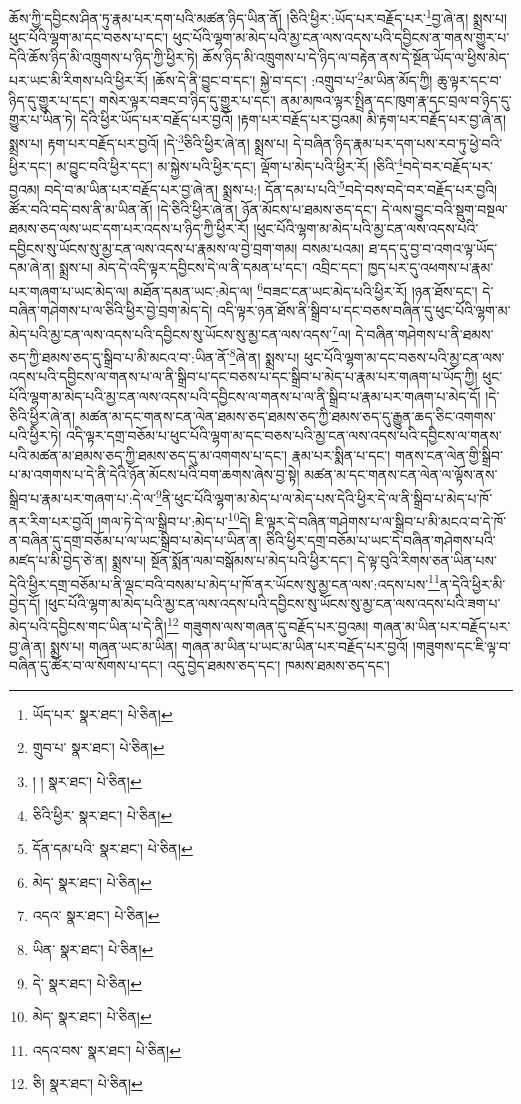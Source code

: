 ཆོས་ཀྱི་དབྱིངས་ཤིན་ཏུ་རྣམ་པར་དག་པའི་མཚན་ཉིད་ཡིན་ནོ། །ཅིའི་ཕྱིར་:ཡོད་པར་བརྗོད་པར་\footnote{ཡོད་པར་  སྣར་ཐང་།  པེ་ཅིན། }བྱ་ཞེ་ན། སྨྲས་པ། ཕུང་པོའི་ལྷག་མ་དང་བཅས་པ་དང་། ཕུང་པོའི་ལྷག་མ་མེད་པའི་མྱ་ངན་ལས་འདས་པའི་དབྱིངས་ན་གནས་གྱུར་པ་དེའི་ཆོས་ཉིད་མི་འཁྲུགས་པ་ཉིད་ཀྱི་ཕྱིར་ཏེ། ཆོས་ཉིད་མི་འཁྲུགས་པ་དེ་ཉིད་ལ་བརྟེན་ནས་དེ་སྔོན་ཡོད་ལ་ཕྱིས་མེད་པར་ཡང་མི་རིགས་པའི་ཕྱིར་རོ། །ཆོས་དེ་ནི་བྱུང་བ་དང་། སྐྱེ་བ་དང་། :འགྲུབ་པ་\footnote{གྲུབ་པ་  སྣར་ཐང་།  པེ་ཅིན། }མ་ཡིན་མོད་ཀྱི། ཆུ་ལྟར་དང་བ་ཉིད་དུ་གྱུར་པ་དང་། གསེར་ལྟར་བཟང་བ་ཉིད་དུ་གྱུར་པ་དང་། ནམ་མཁའ་ལྟར་སྤྲིན་དང་ཁུག་རྣ་དང་བྲལ་བ་ཉིད་དུ་གྱུར་པ་ཡིན་ཏེ། དེའི་ཕྱིར་ཡོད་པར་བརྗོད་པར་བྱའོ། །རྟག་པར་བརྗོད་པར་བྱའམ། མི་རྟག་པར་བརྗོད་པར་བྱ་ཞེ་ན། སྨྲས་པ། རྟག་པར་བརྗོད་པར་བྱའོ། །དེ་\footnote{། །  སྣར་ཐང་།  པེ་ཅིན། }ཅིའི་ཕྱིར་ཞེ་ན། སྨྲས་པ། དེ་བཞིན་ཉིད་རྣམ་པར་དག་པས་རབ་ཏུ་ཕྱེ་བའི་ཕྱིར་དང་། མ་བྱུང་བའི་ཕྱིར་དང་། མ་སྐྱེས་པའི་ཕྱིར་དང་། ལྡོག་པ་མེད་པའི་ཕྱིར་རོ། །ཅིའི་\footnote{ཅིའི་ཕྱིར་  སྣར་ཐང་།  པེ་ཅིན། }བདེ་བར་བརྗོད་པར་བྱའམ། བདེ་བ་མ་ཡིན་པར་བརྗོད་པར་བྱ་ཞེ་ན། སྨྲས་པ:། དོན་དམ་པ་པའི་\footnote{དོན་དམ་པའི་  སྣར་ཐང་།  པེ་ཅིན། }བདེ་བས་བདེ་བར་བརྗོད་པར་བྱའི། ཚོར་བའི་བདེ་བས་ནི་མ་ཡིན་ནོ། །དེ་ཅིའི་ཕྱིར་ཞེ་ན། ཉོན་མོངས་པ་ཐམས་ཅད་དང་། དེ་ལས་བྱུང་བའི་སྡུག་བསྔལ་ཐམས་ཅད་ལས་ཡང་དག་པར་འདས་པ་ཉིད་ཀྱི་ཕྱིར་རོ། །ཕུང་པོའི་ལྷག་མ་མེད་པའི་མྱ་ངན་ལས་འདས་པའི་དབྱིངས་སུ་ཡོངས་སུ་མྱ་ངན་ལས་འདས་པ་རྣམས་ལ་བྱེ་བྲག་གམ། བསམ་པའམ། ཐ་དད་དུ་བྱ་བ་འགའ་ལྟ་ཡོད་དམ་ཞེ་ན། སྨྲས་པ། མེད་དེ་འདི་ལྟར་དབྱིངས་དེ་ལ་ནི་དམན་པ་དང་། འབྲིང་དང་། ཁྱད་པར་དུ་འཕགས་པ་རྣམ་པར་གཞག་པ་ཡང་མེད་ལ། མཐོན་དམན་ཡང་:མེད་ལ། \footnote{མེད་  སྣར་ཐང་།  པེ་ཅིན། }བཟང་ངན་ཡང་མེད་པའི་ཕྱིར་རོ། །ཉན་ཐོས་དང་། དེ་བཞིན་གཤེགས་པ་ལ་ཅིའི་ཕྱིར་བྱེ་བྲག་མེད་དེ། འདི་ལྟར་ཉན་ཐོས་ནི་སྒྲིབ་པ་དང་བཅས་བཞིན་དུ་ཕུང་པོའི་ལྷག་མ་མེད་པའི་མྱ་ངན་ལས་འདས་པའི་དབྱིངས་སུ་ཡོངས་སུ་མྱ་ངན་ལས་འདས་\footnote{འདའ་  སྣར་ཐང་།  པེ་ཅིན། }ལ། དེ་བཞིན་གཤེགས་པ་ནི་ཐམས་ཅད་ཀྱི་ཐམས་ཅད་དུ་སྒྲིབ་པ་མི་མངའ་བ་:ཡིན་ནོ་\footnote{ཡིན་  སྣར་ཐང་།  པེ་ཅིན། }ཞེ་ན། སྨྲས་པ། ཕུང་པོའི་ལྷག་མ་དང་བཅས་པའི་མྱ་ངན་ལས་འདས་པའི་དབྱིངས་ལ་གནས་པ་ལ་ནི་སྒྲིབ་པ་དང་བཅས་པ་དང་སྒྲིབ་པ་མེད་པ་རྣམ་པར་གཞག་པ་ཡོད་ཀྱི། ཕུང་པོའི་ལྷག་མ་མེད་པའི་མྱ་ངན་ལས་འདས་པའི་དབྱིངས་ལ་གནས་པ་ལ་ནི་སྒྲིབ་པ་རྣམ་པར་གཞག་པ་མེད་དོ། །དེ་ཅིའི་ཕྱིར་ཞེ་ན། མཚན་མ་དང་གནས་ངན་ལེན་ཐམས་ཅད་ཐམས་ཅད་ཀྱི་ཐམས་ཅད་དུ་རྒྱུན་ཆད་ཅིང་འགགས་པའི་ཕྱིར་ཏེ། འདི་ལྟར་དགྲ་བཅོམ་པ་ཕུང་པོའི་ལྷག་མ་དང་བཅས་པའི་མྱ་ངན་ལས་འདས་པའི་དབྱིངས་ལ་གནས་པའི་མཚན་མ་ཐམས་ཅད་ཀྱི་ཐམས་ཅད་དུ་མ་འགགས་པ་དང་། རྣམ་པར་སྨིན་པ་དང་། གནས་ངན་ལེན་གྱི་སྒྲིབ་པ་མ་འགགས་པ་དེ་ནི་དེའི་ཉོན་མོངས་པའི་བག་ཆགས་ཞེས་བྱ་སྟེ། མཚན་མ་དང་གནས་ངན་ལེན་ལ་ལྟོས་ནས་སྒྲིབ་པ་རྣམ་པར་གཞག་པ་:དེ་ལ་\footnote{དེ་  སྣར་ཐང་།  པེ་ཅིན། }ནི་ཕུང་པོའི་ལྷག་མ་མེད་པ་ལ་མེད་པས་དེའི་ཕྱིར་དེ་ལ་ནི་སྒྲིབ་པ་མེད་པ་ཁོ་ནར་རིག་པར་བྱའོ། །གལ་ཏེ་དེ་ལ་སྒྲིབ་པ་:མེད་པ་\footnote{མེད་  སྣར་ཐང་།  པེ་ཅིན། }དེ། ཇི་ལྟར་དེ་བཞིན་གཤེགས་པ་ལ་སྒྲིབ་པ་མི་མངའ་བ་དེ་ཁོ་ན་བཞིན་དུ་དགྲ་བཅོམ་པ་ལ་ཡང་སྒྲིབ་པ་མེད་པ་ཡིན་ན། ཅིའི་ཕྱིར་དགྲ་བཅོམ་པ་ཡང་དེ་བཞིན་གཤེགས་པའི་མཛད་པ་མི་བྱེད་ཅེ་ན། སྨྲས་པ། སྔོན་སྨོན་ལམ་བསྒོམས་པ་མེད་པའི་ཕྱིར་དང་། དེ་ལྟ་བུའི་རིགས་ཅན་ཡིན་པས་དེའི་ཕྱིར་དགྲ་བཅོམ་པ་ནི་ལྡང་བའི་བསམ་པ་མེད་པ་ཁོ་ནར་ཡོངས་སུ་མྱ་ངན་ལས་:འདས་པས་\footnote{འདའ་བས་  སྣར་ཐང་།  པེ་ཅིན། }ན་དེའི་ཕྱིར་མི་བྱེད་དོ། །ཕུང་པོའི་ལྷག་མ་མེད་པའི་མྱ་ངན་ལས་འདས་པའི་དབྱིངས་སུ་ཡོངས་སུ་མྱ་ངན་ལས་འདས་པའི་ཟག་པ་མེད་པའི་དབྱིངས་གང་ཡིན་པ་དེ་ནི།\footnote{ཅི།  སྣར་ཐང་།  པེ་ཅིན། } གཟུགས་ལས་གཞན་དུ་བརྗོད་པར་བྱའམ། གཞན་མ་ཡིན་པར་བརྗོད་པར་བྱ་ཞེ་ན། སྨྲས་པ། གཞན་ཡང་མ་ཡིན། གཞན་མ་ཡིན་པ་ཡང་མ་ཡིན་པར་བརྗོད་པར་བྱའོ། །གཟུགས་དང་ཇི་ལྟ་བ་བཞིན་དུ་ཚོར་བ་ལ་སོགས་པ་དང་། འདུ་བྱེད་ཐམས་ཅད་དང་། ཁམས་ཐམས་ཅད་དང་། 